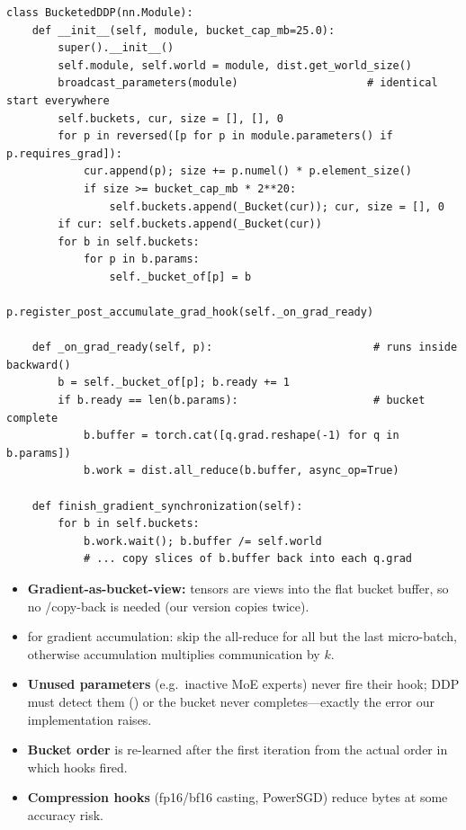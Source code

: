 \begin{lstlisting}[caption={Bucketed DDP from scratch (\code{llmsys/dist/ddp.py}, abridged).},label={lst:dist:ddp}]
class BucketedDDP(nn.Module):
    def __init__(self, module, bucket_cap_mb=25.0):
        super().__init__()
        self.module, self.world = module, dist.get_world_size()
        broadcast_parameters(module)                    # identical start everywhere
        self.buckets, cur, size = [], [], 0
        for p in reversed([p for p in module.parameters() if p.requires_grad]):
            cur.append(p); size += p.numel() * p.element_size()
            if size >= bucket_cap_mb * 2**20:
                self.buckets.append(_Bucket(cur)); cur, size = [], 0
        if cur: self.buckets.append(_Bucket(cur))
        for b in self.buckets:
            for p in b.params:
                self._bucket_of[p] = b
                p.register_post_accumulate_grad_hook(self._on_grad_ready)

    def _on_grad_ready(self, p):                         # runs inside backward()
        b = self._bucket_of[p]; b.ready += 1
        if b.ready == len(b.params):                     # bucket complete
            b.buffer = torch.cat([q.grad.reshape(-1) for q in b.params])
            b.work = dist.all_reduce(b.buffer, async_op=True)

    def finish_gradient_synchronization(self):
        for b in self.buckets:
            b.work.wait(); b.buffer /= self.world
            # ... copy slices of b.buffer back into each q.grad
\end{lstlisting}

\begin{systemslens}
\begin{itemize}
\item \textbf{Gradient-as-bucket-view:}  tensors are views into the flat bucket
  buffer, so no /copy-back is needed (our version copies twice).
\item \textbf{} for gradient accumulation: skip the all-reduce for all but the
  last micro-batch, otherwise accumulation multiplies communication by $k$.
\item \textbf{Unused parameters} (e.g.\ inactive MoE experts) never fire their hook; DDP must
  detect them () or the bucket never completes---exactly the
  error our implementation raises.
\item \textbf{Bucket order} is re-learned after the first iteration from the actual order in
  which hooks fired.
\item \textbf{Compression hooks} (fp16/bf16 casting, PowerSGD) reduce bytes at some accuracy
  risk.
\end{itemize}
\end{systemslens}

